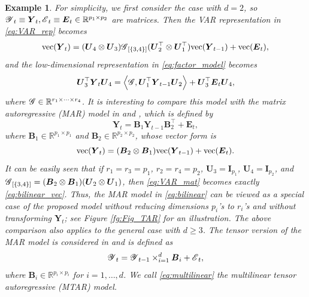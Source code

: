 \documentclass[12pt]{article}
\newtheorem{example}{Example}
\newcommand{\bm}{\boldsymbol}
\newcommand{\cm}[1]{\mbox{\boldmath$\mathscr{#1}$}}
\begin{document}
\begin{example}\label{ex1}
For simplicity, we first consider the case with $d=2$, so $\cm{Y}_t\equiv \bm{Y}_t, \cm{E}_t\equiv \bm{E}_t\in\mathbb{R}^{p_1\times p_2}$ are matrices. Then the VAR representation in \eqref{eq:VAR_rep} becomes 
\begin{equation}\label{eq:VAR_mat}
\textup{vec}(\bm{Y}_t)=(\bm{U}_4\otimes\bm{U}_3)\cm{G}_{[\{3,4\}]}(\bm{U}_2^\top\otimes\bm{U}_1^\top)\textup{vec}(\bm{Y}_{t-1})+\textup{vec}(\bm{E}_t),
\end{equation}
and the low-dimensional representation in \eqref{eq:factor_model} becomes
\begin{equation*}%
\bm{U}_{3}^\top\bm{Y}_t\bm{U}_{4} =\left \langle\cm{G},\bm{U}_{1}^\top\bm{Y}_{t-1}\bm{U}_{2}\right \rangle+\bm{U}_{3}^\top\bm{E}_t\bm{U}_{4},
\end{equation*}
where $\cm{G}\in\mathbb{R}^{r_1\times \cdots \times r_4}$. It is interesting to compare this model with the matrix autoregressive (MAR) model in \cite{chen2018autoregressive} and \cite{hoff15}, which is defined by 
\begin{equation}
\label{eq:bilinear}
\bm{Y}_t=\bm{B}_1\bm{Y}_{t-1}\bm{B}_2^\top+\bm{E}_t,
\end{equation}
where $\bm{B}_1\in\mathbb{R}^{p_1\times p_1}$ and $\bm{B}_2\in\mathbb{R}^{p_2\times p_2}$, whose vector form is 
\begin{equation}\label{eq:bilinear_vec}
\textup{vec}(\bm{Y}_t)=(\bm{B}_2\otimes \bm{B}_1)\textup{vec}(\bm{Y}_{t-1})+\textup{vec}(\bm{E}_t).
\end{equation}
It can be easily seen that if $r_1=r_3=p_1$, $r_2=r_4=p_2$, $\bm{U}_{3}=\bm{I}_{p_1}$, $\bm{U}_{4}=\bm{I}_{p_2}$, and $\cm{G}_{[\{3,4\}]}=(\bm{B}_2\otimes \bm{B}_1)(\bm{U}_2\otimes \bm{U}_1)$, then \eqref{eq:VAR_mat} becomes exactly  \eqref{eq:bilinear_vec}. Thus, the MAR model in \eqref{eq:bilinear} can be viewed as a special case of the proposed model without reducing dimensions $p_i$'s to $r_i$'s and without transforming $\bm{Y}_t$; see Figure \ref{fg:Fig_TAR} for an illustration. 
The above comparison also applies to the general case  with $d\geq 3$. The tensor version of the MAR model is considered in \cite{hoff15} and is defined as
\begin{equation}\label{eq:multilinear}
\cm{Y}_t=\cm{Y}_{t-1}\times_{i=1}^d\bm{B}_i+\cm{E}_t,
\end{equation}
where $\bm{B}_i\in\mathbb{R}^{p_i\times p_i}$ for $i=1,\dots,d$. We call \eqref{eq:multilinear} the multilinear tensor autoregressive (MTAR) model.

\end{example}
\end{document}
